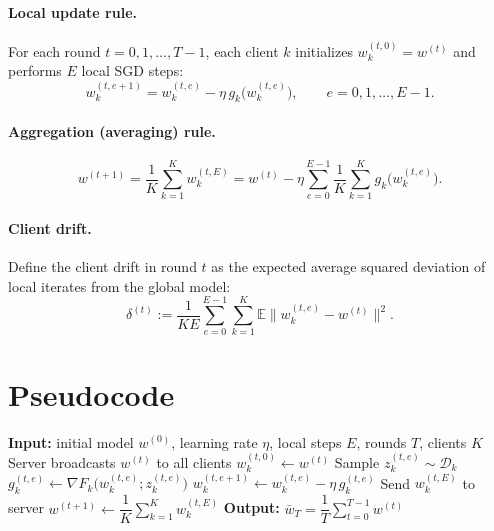 \documentclass[11pt]{article}
\begin{document}
\paragraph{Local update rule.}
For each round $t = 0,1,\dots,T-1$, each client $k$ initializes
$w_k^{(t,0)} = w^{(t)}$ and performs $E$ local SGD steps:
\[
w_k^{(t,e+1)} = w_k^{(t,e)} - \eta\, g_k\!\big(w_k^{(t,e)}\big),
\qquad e = 0,1,\dots,E-1 .
\]

\paragraph{Aggregation (averaging) rule.}
\[
w^{(t+1)} = \frac{1}{K}\sum_{k=1}^{K} w_k^{(t,E)}
          = w^{(t)} - \eta \sum_{e=0}^{E-1}\frac{1}{K}\sum_{k=1}^{K} g_k\!\big(w_k^{(t,e)}\big).
\]

\paragraph{Client drift.}
Define the client drift in round $t$ as the expected average squared deviation of local
iterates from the global model:
\[
\delta^{(t)} := \frac{1}{KE}\sum_{e=0}^{E-1}\sum_{k=1}^{K}
\mathbb{E}\big\| w_k^{(t,e)} - w^{(t)} \big\|^2 .
\]

\section*{Pseudocode}

\begin{algorithm}[H]
\caption{Federated Averaging (Local SGD)}
\begin{algorithmic}[1]
\State \textbf{Input:} initial model $w^{(0)}$, learning rate $\eta$, local steps $E$, rounds $T$, clients $K$
    \State Server broadcasts $w^{(t)}$ to all clients
        \State $w_k^{(t,0)} \gets w^{(t)}$
            \State Sample $z_k^{(t,e)} \sim \mathcal{D}_k$
            \State $g_k^{(t,e)} \gets \nabla F_k\big(w_k^{(t,e)}; z_k^{(t,e)}\big)$
            \State $w_k^{(t,e+1)} \gets w_k^{(t,e)} - \eta\, g_k^{(t,e)}$
        \EndFor
        \State Send $w_k^{(t,E)}$ to server
    \EndFor
    \State $w^{(t+1)} \gets \dfrac{1}{K}\sum_{k=1}^{K} w_k^{(t,E)}$
\EndFor
\State \textbf{Output:} $\bar w_T = \dfrac{1}{T}\sum_{t=0}^{T-1} w^{(t)}$
\end{algorithmic}
\end{algorithm}
\end{document}
